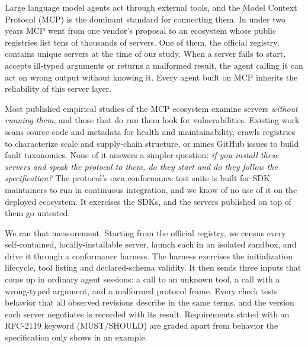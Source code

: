 Large language model agents act through external tools, and the Model Context
Protocol (MCP) is the dominant standard for connecting them. In under two years MCP
went from one vendor's proposal to an ecosystem whose public registries list tens of
thousands of servers. One of them, the
official registry, contains \Nframe{} unique servers at the time of our study.
When a server fails to start, accepts ill-typed arguments or returns a malformed
result, the agent calling it can act on wrong output without knowing it. Every agent
built on MCP inherits the reliability of this server layer.

Most published empirical studies of the MCP ecosystem examine servers
\emph{without running them}, and those that do run them look for vulnerabilities. Existing work scans source code and metadata for health and
maintainability, crawls registries to characterize scale and supply-chain
structure, or mines GitHub issues to build fault taxonomies. None of it answers a simpler
question: \emph{if you install these servers and speak the protocol to them, do they
start and do they follow the specification?} The protocol's own
conformance test suite is built for SDK maintainers to run in continuous integration,
and we know of no use of it on the deployed ecosystem. It
exercises the SDKs, and the \Nframe{} servers published on top of them go untested.

We ran that measurement. Starting from the official registry, we census every
self-contained, locally-installable server, launch each in an isolated sandbox, and
drive it through a conformance harness. The harness exercises the initialization
lifecycle, tool listing and declared-schema validity. It then sends three inputs that
come up in ordinary agent sessions: a call to an unknown tool, a call with a
wrong-typed argument, and a malformed protocol frame. Every check tests behavior that all
observed revisions describe in the same terms, and the version each server negotiates is
recorded with its result. Requirements stated with an RFC-2119 keyword
(\textsf{MUST}/\textsf{SHOULD}) are graded apart from behavior the specification
only shows in an example.


